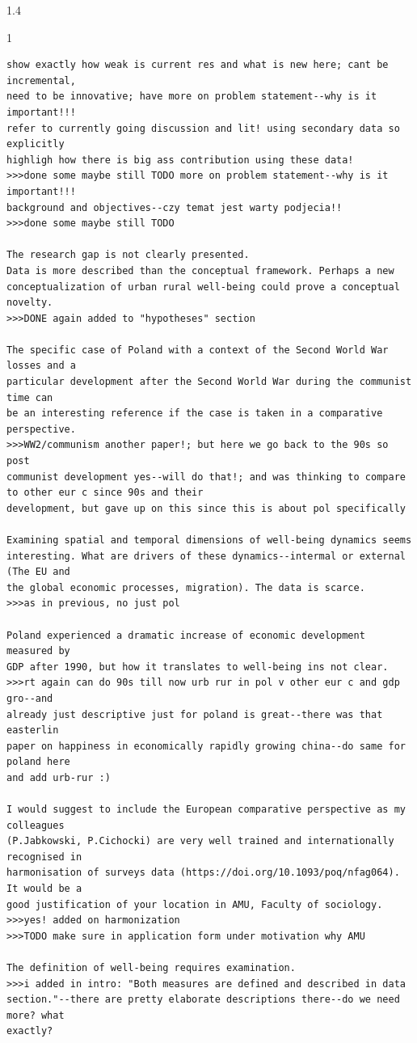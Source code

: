 \documentclass[10pt, letterpaper]{article}
\begin{document}
\begin{spacing}{1.4}
\begin{scriptsize}
\begin{spacing}{1}
\begin{verbatim}
show exactly how weak is current res and what is new here; cant be incremental,
need to be innovative; have more on problem statement--why is it important!!!
refer to currently going discussion and lit! using secondary data so explicitly
highligh how there is big ass contribution using these data!
>>>done some maybe still TODO more on problem statement--why is it important!!!
background and objectives--czy temat jest warty podjecia!!
>>>done some maybe still TODO

The research gap is not clearly presented.
Data is more described than the conceptual framework. Perhaps a new
conceptualization of urban rural well-being could prove a conceptual novelty.
>>>DONE again added to "hypotheses" section

The specific case of Poland with a context of the Second World War losses and a
particular development after the Second World War during the communist time can
be an interesting reference if the case is taken in a comparative perspective.
>>>WW2/communism another paper!; but here we go back to the 90s so post
communist development yes--will do that!; and was thinking to compare to other eur c since 90s and their
development, but gave up on this since this is about pol specifically

Examining spatial and temporal dimensions of well-being dynamics seems
interesting. What are drivers of these dynamics--intermal or external (The EU and
the global economic processes, migration). The data is scarce.
>>>as in previous, no just pol  

Poland experienced a dramatic increase of economic development measured by
GDP after 1990, but how it translates to well-being ins not clear.
>>>rt again can do 90s till now urb rur in pol v other eur c and gdp gro--and
already just descriptive just for poland is great--there was that easterlin
paper on happiness in economically rapidly growing china--do same for poland here
and add urb-rur :)

I would suggest to include the European comparative perspective as my colleagues
(P.Jabkowski, P.Cichocki) are very well trained and internationally recognised in
harmonisation of surveys data (https://doi.org/10.1093/poq/nfag064). It would be a
good justification of your location in AMU, Faculty of sociology.
>>>yes! added on harmonization
>>>TODO make sure in application form under motivation why AMU

The definition of well-being requires examination.
>>>i added in intro: "Both measures are defined and described in data
section."--there are pretty elaborate descriptions there--do we need more? what
exactly?


\end{verbatim}
\end{spacing}
\end{scriptsize}
\end{spacing}
\end{document}
